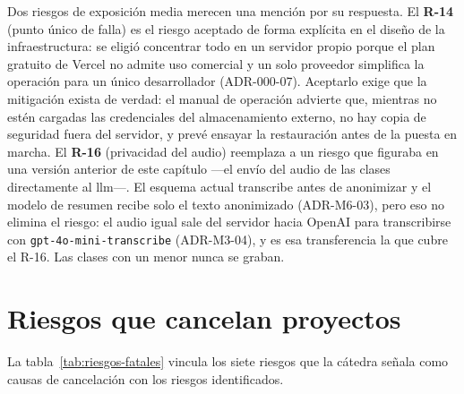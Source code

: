 Dos riesgos de exposición media merecen una mención por su respuesta. El
\textbf{R-14} (punto único de falla) es el riesgo aceptado de forma
explícita en el diseño de la infraestructura: se eligió concentrar todo
en un servidor propio porque el plan gratuito de Vercel no admite uso
comercial y un solo proveedor simplifica la operación para un único
desarrollador (ADR-000-07). Aceptarlo exige que la mitigación exista de
verdad: el manual de operación advierte que, mientras no estén cargadas
las credenciales del almacenamiento externo, no hay copia de seguridad
fuera del servidor, y prevé ensayar la restauración antes de la puesta en marcha. El
\textbf{R-16} (privacidad del audio) reemplaza a un riesgo que figuraba
en una versión anterior de este capítulo ---el envío del audio de las
clases directamente al \gls{llm}---. El esquema actual transcribe antes
de anonimizar y el modelo de resumen recibe solo el texto anonimizado
(ADR-M6-03), pero eso no elimina el riesgo: el audio igual sale del
servidor hacia OpenAI para transcribirse con
\texttt{gpt-4o-mini-transcribe} (ADR-M3-04), y es esa transferencia la
que cubre el R-16. Las clases con un menor nunca se graban.

\section{Riesgos que cancelan proyectos}

La tabla~\ref{tab:riesgos-fatales} vincula los siete riesgos que la
cátedra señala como causas de cancelación con los riesgos identificados.

